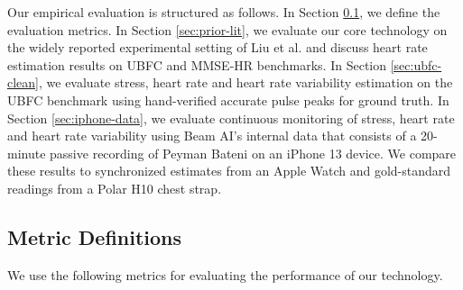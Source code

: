 \documentclass{article}
\begin{document}
Our empirical evaluation is structured as follows. In Section \ref{sec:definitions}, we define the evaluation metrics. In Section \ref{sec:prior-lit}, we evaluate our core technology on the widely reported experimental setting of Liu et al.\cite{TSCAN_Liu2020, EfficientPhys_Liu2021, MetaPhys_Liu2021} and discuss heart rate estimation results on UBFC \cite{Bobbia17_UBFC} and MMSE-HR \cite{Zhang16_MMSE} benchmarks. In Section \ref{sec:ubfc-clean}, we evaluate stress, heart rate and heart rate variability estimation on the UBFC \cite{Bobbia17_UBFC} benchmark using hand-verified accurate pulse peaks for ground truth. In Section \ref{sec:iphone-data}, we evaluate continuous monitoring of stress, heart rate and heart rate variability using Beam AI's internal data that consists of a 20-minute passive recording of Peyman Bateni on an iPhone 13 device. We compare these results to synchronized estimates from an Apple Watch and gold-standard readings from a Polar H10 chest strap.

\subsection{Metric Definitions}
\label{sec:definitions}

We use the following metrics for evaluating the performance of our technology.
\end{document}
